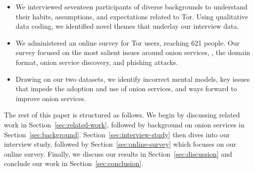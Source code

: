 \begin{itemize}
    \item We interviewed seventeen participants of diverse backgrounds to
        understand their habits, assumptions, and expectations related to Tor.
        Using qualitative data coding, we identified novel themes that underlay
        our interview data.

    \item We administered an online survey for Tor users, reaching 621 people.
        Our survey focused on the most salient issues around onion services,
        \eg, the domain format, onion service discovery, and phishing attacks.

    \item Drawing on our two datasets, we identify \first incorrect mental
        models, \second key issues that impede the adoption and use of onion
        services, and \third ways forward to improve onion services.
\end{itemize}

The rest of this paper is structured as follows.  We begin by discussing related
work in Section~\ref{sec:related-work}, followed by background on onion services
in Section~\ref{sec:background}.  Section~\ref{sec:interview-study} then dives
into our interview study, followed by Section~\ref{sec:online-survey} which
focuses on our online survey.  Finally, we discuss our results in
Section~\ref{sec:discussion} and conclude our work in
Section~\ref{sec:conclusion}.
